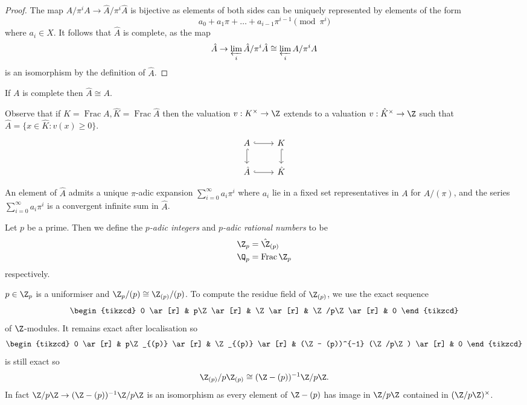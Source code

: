 \documentclass[a4paper]{article}
\DeclareMathOperator{\Frac}{Frac}
\begin{document}
\begin{proof}
  The map \(A/\pi^i A \to \hat A/ \pi^i \hat A\) is bijective as elements of both sides can be uniquely represented by elements of the form
  \[
    a_0 + a_1 \pi + \dots + a_{i - 1}\pi^{i - 1} \pmod{\pi^i}
  \]
  where \(a_i \in X\). It follows that \(\hat A\) is complete, as the map
  \[
    \hat A \to \varprojlim_i \hat A/\pi^i \hat A \cong \varprojlim_i A/\pi^i A
  \]
  is an isomorphism by the definition of \(\hat A\).
\end{proof}

\begin{remark}
  If \(A\) is complete then \(\hat A \cong A\).
\end{remark}

Observe that if \(K = \Frac A, \hat K = \Frac \hat A\) then the valuation \(v: K^\times \to \Z\) extends to a valuation \(v: \hat K^\times \to \Z\) such that \(\hat A = \{x \in \hat K: v(x) \geq 0\}\).
\[
  \begin{tikzcd}
    A \ar[r, hook] \ar[d, hook] & K \ar[d, hook] \\
    \hat A \ar[r, hook] & \hat K
  \end{tikzcd}
\]

An element of \(\hat A\) admits a unique \(\pi\)-adic expansion \(\sum_{i = 0}^\infty a_i \pi^i\) where \(a_i\) lie in a fixed set representatives in \(A\) for \(A/(\pi)\), and the series \(\sum_{i = 0}^\infty a_i \pi^i\) is a convergent infinite sum in \(\hat A\).

\begin{definition}
  Let \(p\) be a prime. Then we define the \emph{\(p\)-adic integers} and \emph{\(p\)-adic rational numbers} to be
  \begin{align*}
    \Z_p &= \hat \Z_{(p)} \\
    \Q_p &= \Frac \Z_p
  \end{align*}
  respectively.
\end{definition}

\(p \in \Z_p\) is a uniformiser and \(\Z_p/(p) \cong \Z_{(p)}/(p)\). To compute the residue field of \(\Z_{(p)}\), we use the exact sequence
\[
  \begin{tikzcd}
    0 \ar[r] & p\Z \ar[r] & \Z \ar[r] & \Z/p\Z \ar[r] & 0
  \end{tikzcd}
\]
of \(\Z\)-modules. It remains exact after localisation so
\[
  \begin{tikzcd}
    0 \ar[r] & p\Z_{(p)} \ar[r] & \Z_{(p)} \ar[r] & (\Z - (p))^{-1} (\Z/p\Z) \ar[r] & 0
  \end{tikzcd}
\]
is still exact so
\[
  \Z_{(p)}/p\Z_{(p)} \cong (\Z - (p))^{-1}\Z/p\Z.
\]
In fact \(\Z/p\Z \to (\Z - (p))^{-1} \Z/p\Z\) is an isomorphism as every element of \(\Z - (p)\) has image in \(\Z/p\Z\) contained in \((\Z/p\Z)^\times\).
\end{document}

